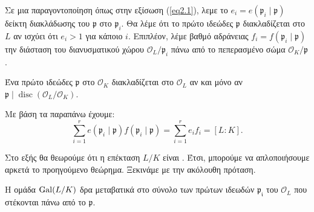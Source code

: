 \begin{defn}
	Σε μια παραγοντοποίηση όπως στην εξίσωση (\ref{eq2.1}), λεμε το $e_i = e(\mathfrak{p}_i \mid \mathfrak{p})$ δείκτη διακλάδωσης του $\mathfrak{p}$ στο 
	$\mathfrak{p}_i$. Θα λέμε ότι το πρώτο ιδεώδες $\mathfrak{p}$ διακλαδίζεται στο $L$ αν ισχύει ότι $e_i >1$ για κάποιο $i$. Επιπλέον, λέμε βαθμό αδράνειας 
	$f_i = f(\mathfrak{p}_i \mid \mathfrak{p})$ την διάσταση του διανυσματικού χώρου $\mathcal{O}_L/\mathfrak{p}_i$ πάνω από το πεπερασμένο σώμα 
	$\mathcal{O}_K/\mathfrak{p}$. 
\end{defn}%

\begin{prop}
	Ένα πρώτο ιδεώδες $\mathfrak{p}$ στο $\mathcal{O}_K$ διακλαδίζεται στο $\mathcal{O}_L$ αν και μόνο αν $\mathfrak{p} \mid \operatorname{disc} 
	(\mathcal{O}_L/\mathcal{O}_K)$.
\end{prop}


\begin{theorem}
	Με βάση τα παραπάνω έχουμε:
	\begin{equation}
		\sum\limits_{i=1}^r e(\mathfrak{p}_i\mid \mathfrak{p}) f(\mathfrak{p}_i \mid \mathfrak{p}) = \sum\limits_{i=1}^r e_i f_i = [L:K].
	\end{equation}
\end{theorem}

\noindent Στο εξής θα θεωρούμε ότι η επέκταση $L/K$ είναι . Έτσι, μπορούμε να απλοποιήσουμε αρκετά το προηγούμενο θεώρημα. Ξεκινάμε με την ακόλουθη πρόταση.

\begin{prop} \label{prop2.5}
	Η ομάδα $\operatorname{Gal}(L/K)$ δρα μεταβατικά στο σύνολο των πρώτων ιδεωδών $\mathfrak{p_i}$ του $\mathcal{O}_L$ που στέκονται πάνω από το $\mathfrak{p}$.
\end{prop}

